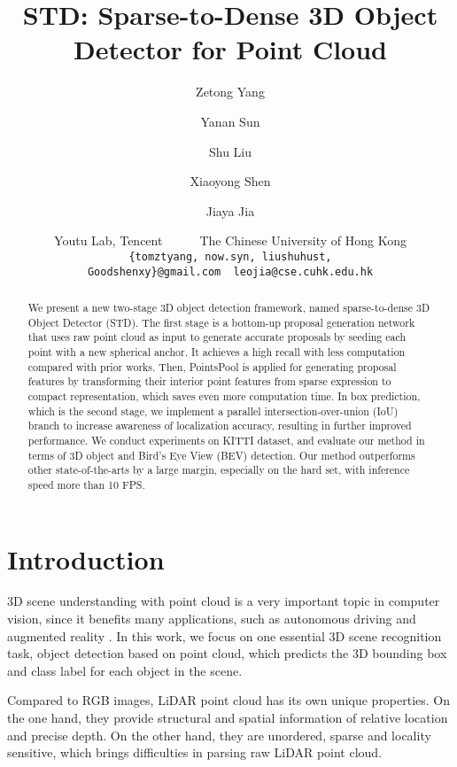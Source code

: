 \documentclass[10pt,twocolumn,letterpaper]{article}
\begin{document}
\title{STD: Sparse-to-Dense 3D Object Detector for Point Cloud}

\author{Zetong Yang\\
\and
Yanan Sun
\and
Shu Liu
\and 
Xiaoyong Shen
\and 
Jiaya Jia
\\
\and
Youtu Lab, Tencent~~~~~~The Chinese University of Hong Kong\\
\vspace{-2mm}
{\tt\small \{tomztyang, now.syn, liushuhust, Goodshenxy\}@gmail.com~~leojia@cse.cuhk.edu.hk} 
}
\maketitle



\begin{abstract}
   We present a new two-stage 3D object detection framework, named sparse-to-dense 3D Object Detector (STD). The first stage is a bottom-up proposal generation network that uses raw point cloud as input to generate accurate proposals by seeding each point with a new spherical anchor. It achieves a high recall with less computation compared with prior works. Then, PointsPool is applied for generating proposal features by transforming their interior point features from sparse expression to compact representation, which saves even more computation time. In box prediction, which is the second stage,  we implement a parallel intersection-over-union (IoU) branch to increase awareness of localization accuracy, resulting in further improved performance. We conduct experiments on KITTI dataset, and evaluate our method in terms of 3D object and Bird's Eye View (BEV) detection. Our method outperforms other state-of-the-arts by a large margin, especially on the hard set, with inference speed more than 10 FPS. 
\end{abstract}

\section{Introduction}
3D scene understanding with point cloud is a very important topic in computer vision, since it benefits many applications, such as autonomous driving \cite{KITTIDATASET2} and augmented reality \cite{Multiple3Dtracking}. In this work, we focus on one essential 3D scene recognition task, object detection based on point cloud, which predicts the 3D bounding box and class label for each object in the scene.

Compared to RGB images, LiDAR point cloud has its own unique properties. On the one hand, they provide structural and spatial information of relative location and precise depth. On the other hand, they are unordered, sparse and locality sensitive, which brings difficulties in parsing raw LiDAR point cloud.
\end{document}
